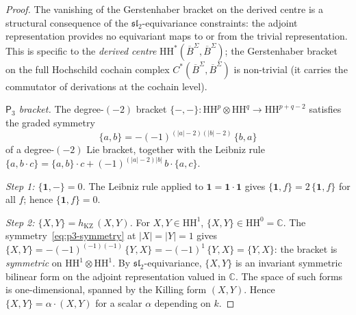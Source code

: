 \documentclass[11pt,reqno]{amsart}
\theoremstyle{definition}
\theoremstyle{remark}
\newcommand{\HH}{\mathrm{HH}}
\newcommand{\Pthree}{\mathsf{P}_{3}}
\newcommand{\BarSig}{\overline{B}^{\Sigma}}
\newcommand{\CC}{\mathbb{C}}
\numberwithin{equation}{section}
\begin{document}
\begin{proof}
The vanishing of the Gerstenhaber bracket on the derived
centre is a structural consequence of the
$\mathfrak{sl}_2$-equivariance constraints: the adjoint
representation provides no equivariant maps to or from the
trivial representation. This is specific to the
\emph{derived centre} $\HH^*(\BarSig, \BarSig)$; the
Gerstenhaber bracket on the full Hochschild cochain complex
$C^*(\BarSig, \BarSig)$ is non-trivial (it carries the
commutator of derivations at the cochain level).

\textit{$\Pthree$ bracket.}
The degree-$(-2)$ bracket
$\{-,-\}\colon \HH^p \otimes \HH^q \to \HH^{p+q-2}$
satisfies the graded symmetry
\begin{equation}\label{eq:p3-symmetry}
  \{a, b\}
  = -(-1)^{(|a|-2)(|b|-2)}\,\{b, a\}
\end{equation}
of a degree-$(-2)$ Lie bracket, together with the Leibniz rule
$\{a, b \cdot c\}
= \{a, b\} \cdot c + (-1)^{(|a|-2)|b|}\,b \cdot \{a, c\}$.

\textit{Step 1: $\{\mathbf{1}, -\} = 0$.}
The Leibniz rule applied to
$\mathbf{1} = \mathbf{1} \cdot \mathbf{1}$ gives
$\{\mathbf{1}, f\} = 2\,\{\mathbf{1}, f\}$
for all $f$; hence $\{\mathbf{1}, f\} = 0$.

\textit{Step 2: $\{X, Y\} = h_{\mathrm{KZ}}\,(X, Y)$.}
For $X, Y \in \HH^1$,
$\{X, Y\} \in \HH^0 = \CC$.
The symmetry~\eqref{eq:p3-symmetry} at
$|X| = |Y| = 1$ gives
$\{X, Y\} = -(-1)^{(-1)(-1)}\,\{Y, X\}
= -(-1)^1\,\{Y, X\}
= \{Y, X\}$:
the bracket is \emph{symmetric} on $\HH^1 \otimes \HH^1$.
By $\mathfrak{sl}_2$-equivariance, $\{X, Y\}$ is an
invariant symmetric bilinear form on the adjoint
representation valued in $\CC$. The space of such forms is
one-dimensional, spanned by the Killing form $(X, Y)$.
Hence $\{X, Y\} = \alpha \cdot (X, Y)$ for a scalar
$\alpha$ depending on $k$.


\end{proof}
\end{document}
